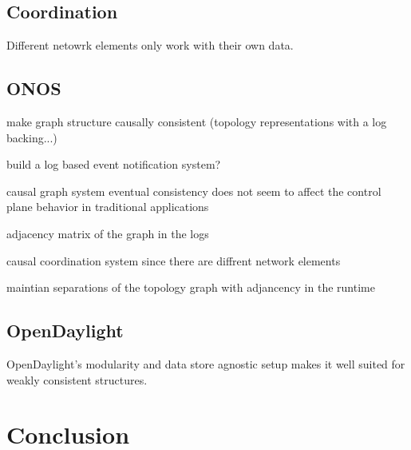 \documentclass[letterpaper,twocolumn,10pt]{article}
\begin{document}
\subsection{Coordination}

Different netowrk elements only work with their own data.

\subsection{ONOS}

make graph structure causally consistent (topology representations with a log backing...)

build a log based event notification system?

causal graph system
    eventual consistency does not seem to affect the control plane behavior in traditional applications

adjacency matrix of the graph in the logs

causal coordination system since there are diffrent network elements

maintian separations of the topology graph with adjancency in the runtime
\subsection{OpenDaylight}

OpenDaylight's modularity and data store agnostic setup makes it well suited for weakly consistent structures.

\section{Conclusion}



\end{document}
